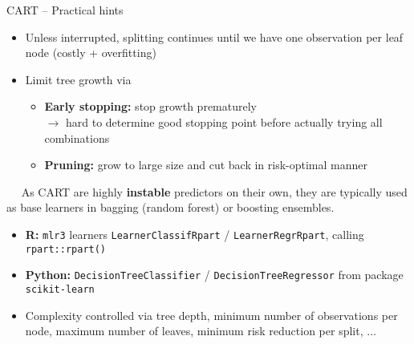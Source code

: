 \begin{frame}{CART -- Practical hints}

\footnotesize


\begin{itemize}
  \item Unless interrupted, splitting continues until we have one observation per 
  leaf node (costly + overfitting)
  \item Limit tree growth via
  \begin{itemize}
    \item \textbf{Early stopping:} stop growth prematurely \\ $\rightarrow$ hard 
    to determine good stopping point before actually trying all combinations
    \item \textbf{Pruning:} grow to large size and cut back in risk-optimal 
    manner
  \end{itemize}
\end{itemize}

\medskip

 ~~ 
As CART are highly \textbf{instable} predictors on their own, they are typically 
used as base learners in bagging (random forest) or boosting ensembles.

\medskip

\begin{itemize}
  \item \textbf{R:} \texttt{mlr3} learners \texttt{LearnerClassifRpart} / 
    \texttt{LearnerRegrRpart}, calling \texttt{rpart::rpart()}
  \item \textbf{Python:} \texttt{DecisionTreeClassifier} / 
  \texttt{DecisionTreeRegressor} from package \texttt{scikit-learn}
  \item Complexity controlled via tree depth, minimum number of observations 
  per node, maximum number of leaves, minimum risk reduction per split, ...
\end{itemize}

\end{frame}
